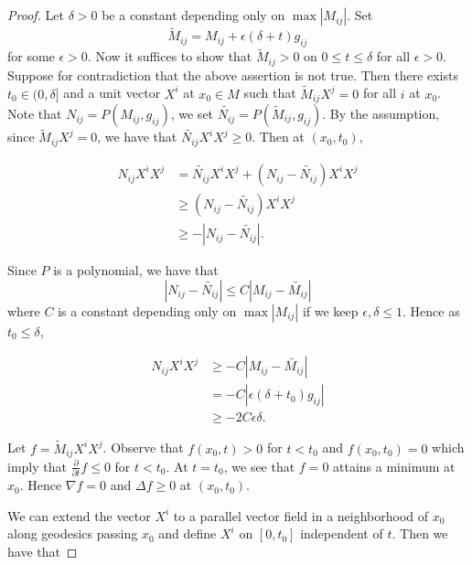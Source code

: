 \begin{proof}
	Let $\delta >0$ be a constant depending only on $\max \left| M_{ij }^{}  \right| $.
	Set \[\tilde{M}_{ij }^{}  = M_{ij }^{} + \epsilon (\delta +t) g_{ij}^{} \] for some $\epsilon >0$. Now it suffices to show that $\tilde{M}_{ij }^{} >0$ on $0 \leq t \leq \delta $ for all $\epsilon >0$.
	Suppose for contradiction that the above assertion is not true. Then there exists $t_0 \in (0,\delta ]$ and a unit vector $X^i $ at $x_0 \in M$ such that $\tilde{M}_{ij }^{} X^j=0$ for all $i$  at $x_0$. Note that $N_{ij }^{} = P(M_{ij }^{} , g_{ij}^{} )$, we set $\tilde{N_{ij }^{} }=P(\tilde{M}_{ij }^{} , g_{ij }^{} )$. By the assumption, since $\tilde{M}_{ij }^{} X^j=0$, we have that $\tilde{N_{ij }^{}} X^i X^j \geq 0$. Then at $(x_0,t_0)$, 

	\begin{equation*}
	\begin{split}
		N_{ij }^{} X^i X^j
	&= \tilde{N_{ij }^{}} X^i X^j + (N_{ij }^{} - \tilde{N_{ij }^{}}) X^i X^j\\
	& \geq (N_{ij }^{} - \tilde{N_{ij }^{}}) X^i X^j\\
	& \geq -\left| N_{ij }^{} - \tilde{N_{ij }^{}} \right|.
	\end{split}
	\end{equation*}

	Since $P$ is a polynomial, we have that \[\left| N_{ij }^{} - \tilde{N_{ij }^{}} \right| \leq C \left| M_{ij }^{} - \tilde{M_{ij }^{}} \right|\] where $C$ is a constant depending only on $\max \left| M_{ij }^{}  \right| $ if we keep $\epsilon , \delta \leq 1$. Hence as $t_0 \leq \delta $,

	\begin{equation}
	\begin{split}
		N_{ij }^{} X^i X^j 
		& \geq -C \left| M_{ij }^{} - \tilde{M_{ij }^{}} \right|\\
		&= -C \left| \epsilon (\delta + t_0) g_{ij }^{}  \right|\\
		& \geq -2C \epsilon \delta.
	\end{split}
	\end{equation}

	Let $f=\tilde{M}_{ij }^{} X^i X^j$. Observe that $f ( x_0,t) > 0 $ for $t<t_0$ and $f ( x_0,t_0) =0$ which imply that $\frac{\partial }{\partial t} f \leq 0$ for $t<t_0$. At $t=t_0$, we see that $f=0$ attains a minimum at $x_0$. Hence $\nabla f=0$ and $\Delta f \geq 0$ at $( x_0,t_0) $.

	We can extend the vector $X^i$ to a parallel vector field in a neighborhood of $x_0$ along geodesics passing $x_0$ and define $X^i$ on $[0,t_0]$ independent of $t$.
	Then we have that
	

\end{proof}

